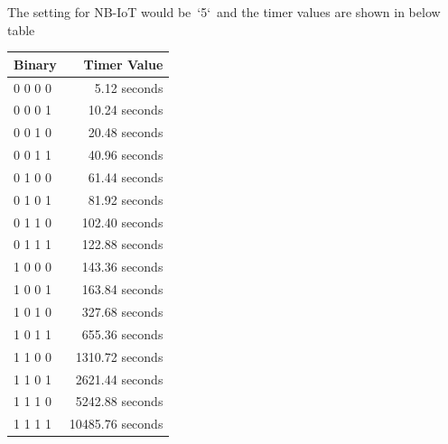 \documentclass[11pt, oneside]{article}   	%
\begin{document}
\pagebreak[4]
\begin{markdown}

The setting for NB-IoT would be `5` and the timer values are shown in below table  

\end{markdown}

\begin{table}[H]
\begin{tabular}{|l|r|}
\hline
\textbf{Binary} & \textbf{Timer Value} \\ \hline
0 0 0 0 & 5.12 seconds \\ \hline
0 0 0 1 & 10.24 seconds \\ \hline
0 0 1 0 & 20.48 seconds \\ \hline
0 0 1 1 & 40.96 seconds \\ \hline
0 1 0 0 & 61.44 seconds \\ \hline
0 1 0 1 & 81.92 seconds \\ \hline
0 1 1 0 & 102.40 seconds \\ \hline
0 1 1 1 & 122.88 seconds \\ \hline
1 0 0 0 & 143.36 seconds \\ \hline
1 0 0 1 & 163.84 seconds \\ \hline
1 0 1 0 & 327.68 seconds \\ \hline
1 0 1 1 & 655.36 seconds \\ \hline
1 1 0 0 & 1310.72 seconds \\ \hline
1 1 0 1 & 2621.44 seconds \\ \hline
1 1 1 0 & 5242.88 seconds \\ \hline
1 1 1 1 & 10485.76 seconds \\ \hline
\end{tabular}
\end{table}
\end{document}
